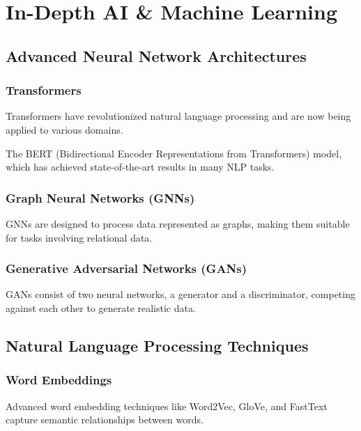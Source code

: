

\chapter{In-Depth AI \& Machine Learning}

\section{Advanced Neural Network Architectures}

\subsection{Transformers}

Transformers have revolutionized natural language processing and are now
being applied to various domains.

\begin{example}
The BERT (Bidirectional Encoder Representations from Transformers) model, which has achieved state-of-the-art results in many NLP tasks.
\end{example}

\subsection{Graph Neural Networks (GNNs)}

GNNs are designed to process data represented as graphs, making them
suitable for tasks involving relational data.

\subsection{Generative Adversarial Networks (GANs)}

GANs consist of two neural networks, a generator and a discriminator,
competing against each other to generate realistic data.

\section{Natural Language Processing Techniques}

\subsection{Word Embeddings}

Advanced word embedding techniques like Word2Vec, GloVe, and FastText
capture semantic relationships between words.

